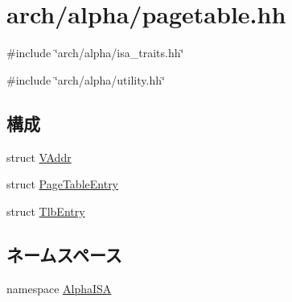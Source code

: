 \hypertarget{alpha_2pagetable_8hh}{
\section{arch/alpha/pagetable.hh}
\label{alpha_2pagetable_8hh}
}
{\ttfamily \#include \char`\"{}arch/alpha/isa\_\-traits.hh\char`\"{}}\par
{\ttfamily \#include \char`\"{}arch/alpha/utility.hh\char`\"{}}\par
\subsection*{構成}
\begin{DoxyCompactItemize}
\item 
struct \hyperlink{structAlphaISA_1_1VAddr}{VAddr}
\item 
struct \hyperlink{structAlphaISA_1_1PageTableEntry}{PageTableEntry}
\item 
struct \hyperlink{structAlphaISA_1_1TlbEntry}{TlbEntry}
\end{DoxyCompactItemize}
\subsection*{ネームスペース}
\begin{DoxyCompactItemize}
\item 
namespace \hyperlink{namespaceAlphaISA}{AlphaISA}
\end{DoxyCompactItemize}
